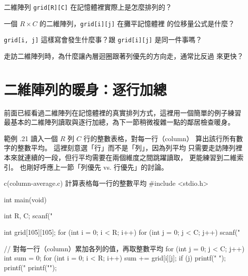 \begin{drills}[label=drills:array-2d-memory]
\item 二維陣列 \texttt{grid[R][C]} 在記憶體裡實際上是怎麼排列的？
\item 一個 $R \times C$ 的二維陣列，\texttt{grid[i][j]} 在攤平記憶體裡
的位移量公式是什麼？
\item \texttt{grid[i, j]} 這樣寫會發生什麼事？跟 \texttt{grid[i][j]}
是同一件事嗎？
\item 走訪二維陣列時，為什麼讓內層迴圈跟著列優先的方向走，通常比反過
來更快？
\end{drills}

\section{二維陣列的暖身：逐行加總}
\label{sec:array-2d-column-sum}

前面已經看過二維陣列在記憶體裡的真實排列方式，這裡用一個簡單的例子練習
最基本的二維陣列讀取與逐行加總，為下一節稍微複雜一點的鄰居檢查暖身。

範例 \thechapter.21 讀入一個 $R$ 列 $C$ 行的整數表格，對每一行（column）
算出該行所有數字的整數平均。 這裡刻意選「行」而不是「列」，因為列平均
只需要走訪陣列裡本來就連續的一段，但行平均需要在兩個維度之間跳躍讀取，
更能練習到二維索引。 也剛好呼應上一節「列優先 vs. 行優先」的討論。

\begin{center}
\label{fig:ch06-2d-column-sum}
\end{center}

\begin{example}{c}{(column-average.c) 計算表格每一行的整數平均}
#include <stdio.h>

int main(void) {
    int R, C;
    scanf("%

    int grid[105][105];
    for (int i = 0; i < R; i++) {
        for (int j = 0; j < C; j++) {
            scanf("%
        }
    }

    // 對每一行（column）累加各列的值，再取整數平均
    for (int j = 0; j < C; j++) {
        int sum = 0;
        for (int i = 0; i < R; i++) {
            sum += grid[i][j];
        }
        if (j) {
            printf(" ");
        }
        printf("%
    }
    printf("\n");
}
\end{example}

